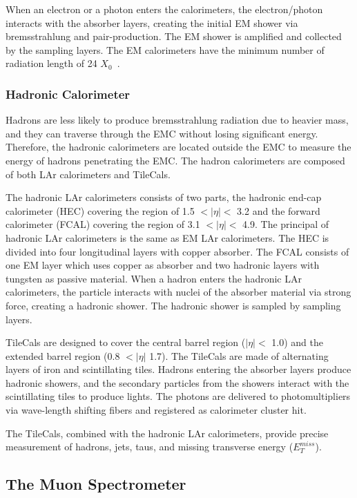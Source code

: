 When an electron or a photon enters the calorimeters, the electron/photon interacts with the absorber layers, creating the initial EM shower via bremsstrahlung and pair-production. The EM shower is amplified and collected by the sampling layers. The EM calorimeters have the minimum number of radiation length of 24 $X_{0}$~\cite{ATLAS-LAR-CALORIMETER}.




\subsubsection{Hadronic Calorimeter}
\label{sec:atlas:Hcal}
Hadrons are less likely to produce bremsstrahlung radiation due to heavier mass, and they can traverse through the EMC without losing significant energy. Therefore, the hadronic calorimeters are located outside the EMC to measure the energy of hadrons penetrating the EMC. The hadron calorimeters are composed of both LAr calorimeters and TileCals.

The hadronic LAr calorimeters consists of two parts, the hadronic end-cap calorimeter (HEC) covering the region of 1.5 $<|\eta|<$ 3.2 and the forward calorimeter (FCAL) covering the region of 3.1 $<|\eta|<$ 4.9. The principal of hadronic LAr calorimeters is the same as EM LAr calorimeters. The HEC is divided into four longitudinal layers with copper absorber. The FCAL consists of one EM layer which uses copper as absorber and two hadronic layers with tungsten as passive material. When a hadron enters the hadronic LAr calorimeters, the particle interacts with nuclei of the absorber material via strong force, creating a hadronic shower. The hadronic shower is sampled by sampling layers.

 TileCals are designed to cover the central barrel region ($|\eta| <$ 1.0) and the extended barrel region (0.8 $<|\eta|$ 1.7). The TileCals are made of alternating layers of iron and scintillating tiles. Hadrons entering the absorber layers produce hadronic showers, and the secondary particles from the showers interact with the scintillating tiles to produce lights. The photons are delivered to photomultipliers via wave-length shifting fibers and registered as calorimeter cluster hit.

The TileCals, combined with the hadronic LAr calorimeters, provide precise measurement of hadrons, jets, taus, and missing transverse energy ($E_{T}^{miss}$).


\subsection{The Muon Spectrometer}
\label{sec:atlas:ms}

